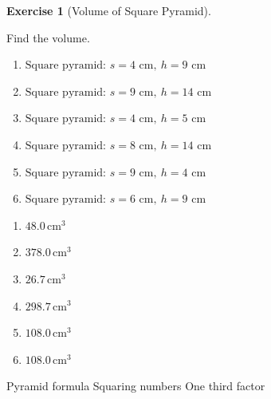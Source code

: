 \documentclass[
  letterpaper,
  DIV=11,
  numbers=noendperiod]{scrreprt}
\theoremstyle{definition}
\newtheorem{exercise}{Exercise}[chapter]
\theoremstyle{remark}
\begin{document}
\begin{exercise}[Volume of Square
Pyramid]\protect\hypertarget{exr-cur-2}{}\label{exr-cur-2}

Find the volume.

\begin{enumerate}
\def\labelenumi{\alph{enumi})}
\item
  \(\text{Square pyramid: }s=4\text{ cm},\ h=9\text{ cm}\)
\item
  \(\text{Square pyramid: }s=9\text{ cm},\ h=14\text{ cm}\)
\item
  \(\text{Square pyramid: }s=4\text{ cm},\ h=5\text{ cm}\)
\item
  \(\text{Square pyramid: }s=8\text{ cm},\ h=14\text{ cm}\)
\item
  \(\text{Square pyramid: }s=9\text{ cm},\ h=4\text{ cm}\)
\item
  \(\text{Square pyramid: }s=6\text{ cm},\ h=9\text{ cm}\)
\end{enumerate}

\begin{tcolorbox}[enhanced jigsaw, opacitybacktitle=0.6, coltitle=black, arc=.35mm, colframe=quarto-callout-tip-color-frame, colback=white, bottomrule=.15mm, left=2mm, colbacktitle=quarto-callout-tip-color!10!white, titlerule=0mm, opacityback=0, title=\textcolor{quarto-callout-tip-color}{\faLightbulb}\hspace{0.5em}{🔍 View Solution}, leftrule=.75mm, breakable, rightrule=.15mm, bottomtitle=1mm, toptitle=1mm, toprule=.15mm]

\begin{enumerate}
\def\labelenumi{\alph{enumi})}
\item
  \(48.0\,\text{cm}^{3}\)
\item
  \(378.0\,\text{cm}^{3}\)
\item
  \(26.7\,\text{cm}^{3}\)
\item
  \(298.7\,\text{cm}^{3}\)
\item
  \(108.0\,\text{cm}^{3}\)
\item
  \(108.0\,\text{cm}^{3}\)
\end{enumerate}

\end{tcolorbox}

{Pyramid formula} {Squaring numbers} {One third factor}

\end{exercise}
\end{document}
